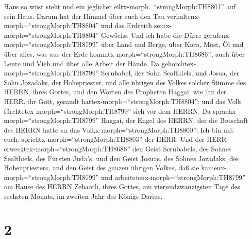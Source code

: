 Haus so wüst steht und ein jeglicher eiltx-morph=``strongMorph:TH8801''
auf sein Haus.  Darum hat der Himmel über euch den Tau
verhaltenx-morph=``strongMorph:TH8804'' und das Erdreich
seinx-morph=``strongMorph:TH8804'' Gewächs.  Und ich habe
die Dürre gerufenx-morph=``strongMorph:TH8799'' über Land und Berge,
über Korn, Most, Öl und über alles, was aus der Erde
kommtx-morph=``strongMorph:TH8686'', auch über Leute und Vieh und über
alle Arbeit der Hände.  Da
gehorchtex-morph=``strongMorph:TH8799'' Serubabel, der Sohn Sealthiels,
und Josua, der Sohn Jozadaks, der Hohepriester, und alle übrigen des
Volkes solcher Stimme des HERRN, ihres Gottes, und den Worten des
Propheten Haggai, wie ihn der HERR, ihr Gott, gesandt
hattex-morph=``strongMorph:TH8804''; und das Volk
fürchtetex-morph=``strongMorph:TH8799'' sich vor dem HERRN.
 Da sprachx-morph=``strongMorph:TH8799'' Haggai, der Engel
des HERRN, der die Botschaft des HERRN hatte an das
Volkx-morph=``strongMorph:TH8800'': Ich bin mit euch,
sprichtx-morph=``strongMorph:TH8803'' der HERR.  Und der
HERR erwecktex-morph=``strongMorph:TH8686'' den Geist Serubabels, des
Sohnes Sealthiels, des Fürsten Juda's, und den Geist Josuas, des Sohnes
Jozadaks, des Hohenpriesters, und den Geist des ganzen übrigen Volkes,
daß sie kamenx-morph=``strongMorph:TH8799'' und
arbeitetenx-morph=``strongMorph:TH8799'' am Hause des HERRN Zebaoth,
ihres Gottes,  am vierundzwanzigsten Tage des sechsten
Monats, im zweiten Jahr des Königs Darius.

\hypertarget{section-1}{%
\section{2}\label{section-1}}

